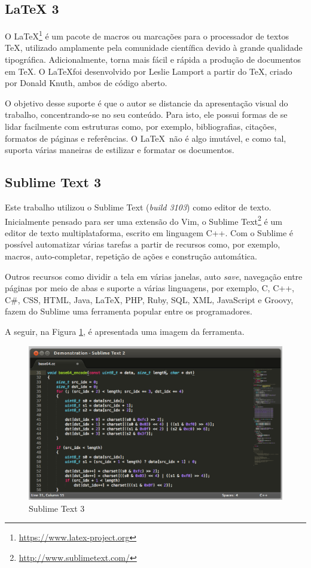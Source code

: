 \begin{apendicesenv}
\subsection{LaTeX 3}

O \LaTeX\footnote{\url{https://www.latex-project.org}} é um pacote de macros ou marcações para o processador de textos \TeX, utilizado amplamente pela comunidade científica devido à grande qualidade tipográfica. Adicionalmente, torna mais fácil e rápida a produção de documentos em \TeX. O \LaTeX foi desenvolvido por Leslie Lamport a partir do \TeX, criado por Donald Knuth, ambos de código aberto.

O objetivo desse suporte é que o autor se distancie da apresentação visual do trabalho, concentrando-se no seu conteúdo. Para isto, ele possui formas de se lidar facilmente com estruturas como, por exemplo, bibliografias, citações, formatos de páginas e referências. O \LaTeX\ não é algo imutável, e como tal, suporta várias maneiras de estilizar e formatar os documentos.

\subsection{Sublime Text 3}

Este trabalho utilizou o Sublime Text (\textit{build 3103}) como editor de texto. Inicialmente pensado para ser uma extensão do Vim, o Sublime Text\footnote{\url{http://www.sublimetext.com/}} é um editor de texto multiplataforma, escrito em linguagem C++. Com o Sublime é possível automatizar várias tarefas a partir de recursos como, por exemplo, macros, auto-completar, repetição de ações e construção automática.

Outros recursos como dividir a tela em várias janelas, auto \textit{save}, navegação entre páginas por meio de abas e suporte a várias linguagens, por exemplo, C, C++, C\#, CSS, HTML, Java, \LaTeX, PHP, Ruby, SQL, XML, JavaScript e Groovy, fazem do Sublime uma ferramenta popular entre os programadores.

A seguir, na Figura \ref{sublime}, é apresentada uma imagem da ferramenta.

\begin{figure}[!h]
	\centering
	\includegraphics[scale=0.35]{figuras/capitulo3/sublime.eps}
	\caption{Sublime Text 3}
	\label{sublime}
\end{figure}


\end{apendicesenv}
